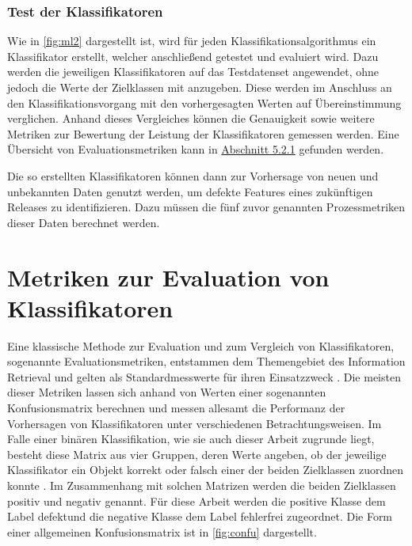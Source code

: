 \subsubsection*{Test der Klassifikatoren}

Wie in \autoref{fig:ml2} dargestellt ist, wird für jeden Klassifikationsalgorithmus ein Klassifikator erstellt, welcher anschließend getestet und evaluiert wird. Dazu werden die jeweiligen Klassifikatoren auf das Testdatenset angewendet, ohne jedoch die Werte der Zielklassen mit anzugeben. Diese werden im Anschluss an den Klassifikationsvorgang mit den vorhergesagten Werten auf Übereinstimmung verglichen. Anhand dieses Vergleiches können die Genauigkeit sowie weitere Metriken zur Bewertung der Leistung der Klassifikatoren gemessen werden. Eine Übersicht von Evaluationsmetriken kann in \hyperref[eval-metrics]{Abschnitt 5.2.1} gefunden werden.

Die so erstellten Klassifikatoren können dann zur Vorhersage von neuen und unbekannten Daten genutzt werden, um defekte Features eines zukünftigen Releases zu identifizieren. Dazu müssen die fünf zuvor genannten Prozessmetriken dieser Daten berechnet werden. 

\section{Metriken zur Evaluation von Klassifikatoren}
\label{eval-metrics}

Eine klassische Methode zur Evaluation und zum Vergleich von Klassifikatoren, sogenannte Evaluationsmetriken, entstammen dem Themengebiet des Information Retrieval und gelten als Standardmesswerte für ihren Einsatzzweck \cite{Sammut2017}. Die meisten dieser Metriken lassen sich anhand von Werten einer sogenannten Konfusionsmatrix berechnen und messen allesamt die Performanz der Vorhersagen von Klassifikatoren unter verschiedenen Betrachtungsweisen. Im Falle einer binären Klassifikation, wie sie auch dieser Arbeit zugrunde liegt, besteht diese Matrix aus vier Gruppen, deren Werte angeben, ob der jeweilige Klassifikator ein Objekt korrekt oder falsch einer der beiden Zielklassen zuordnen konnte \cite{Sammut2017}. Im Zusammenhang mit solchen Matrizen werden die beiden Zielklassen \glqq positiv\grqq{} und \glqq negativ\grqq{} genannt. Für diese Arbeit werden die positive Klasse dem Label \glqq defekt\grqq und die negative Klasse dem Label \glqq fehlerfrei\grqq{} zugeordnet. Die Form einer allgemeinen Konfusionsmatrix ist in \autoref{fig:confu} dargestellt.

